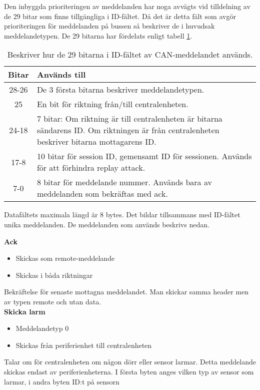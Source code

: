 Den inbyggda prioriteringen av meddelanden har noga avvägts vid tilldelning av de 29 bitar som finns tillgängliga i ID-fältet.
Då det är detta fält som avgör prioriteringen för meddelanden på bussen så beskriver de i huvudsak meddelandetypen.
De 29 bitarna har fördelats enligt tabell \ref{tab:idbitar}.

\begin{table}[H]
	\centering
	\begin{tabular}{|c|p{}|}
		\hline
		Bitar 	& Används till \\ \hline \hline
		28-26		& De 3 första bitarna beskriver meddelandetypen. \\ \hline
		25		& En bit för riktning från/till centralenheten. \\ \hline
		24-18	& 7 bitar:
		Om riktning är till centralenheten är bitarna sändarens ID.
		Om riktningen är från centralenheten beskriver bitarna mottagarens ID. \\ \hline
		17-8 & 10 bitar för session ID, gemensamt ID för sessionen. Används för att förhindra replay attack. \\ \hline
		7-0 & 8 bitar för meddelande nummer. Används bara av meddelanden som bekräftas med ack. \\ \hline

	\end{tabular}
	\caption{Beskriver hur de 29 bitarna i ID-fältet av CAN-meddelandet används.}
	\label{tab:idbitar}
\end{table}


Datafältets maximala längd är 8 bytes. Det bildar tillsammans med ID-fältet unika meddelanden. De meddelanden som används beskrivs nedan.



\textbf{Ack}
\begin{itemize}
    \item Skickas som remote-meddelande
    \item Skickas i båda riktningar
\end{itemize}
Bekräftelse för senaste mottagna meddelandet. Man skickar samma header men av typen remote och utan data. \\


\textbf{Skicka larm}
\begin{itemize}
    \item Meddelandetyp 0
    \item Skickas från periferienhet till centralenheten
\end{itemize}
Talar om för centralenheten om någon dörr eller sensor larmar. Detta meddelande skickas endast av periferienheterna. I första byten anges vilken typ av sensor som larmar, i andra byten ID:t på sensorn\\


